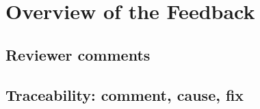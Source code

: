 \section{Overview of the Feedback}\label{sec:feedback}


\subsection{Reviewer comments}\label{sec:comments}

\subsection{Traceability: comment, cause, fix}\label{sec:traceability}
